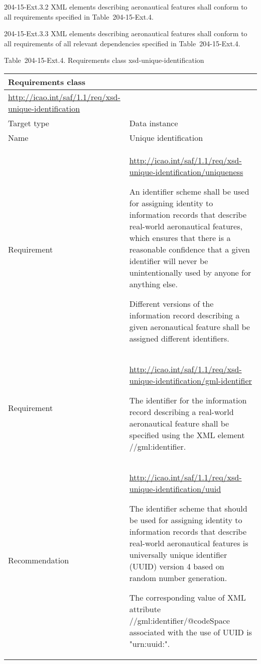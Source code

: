 204-15-Ext.3.2 XML elements describing aeronautical features shall conform to all requirements specified in Table~204-15-Ext.4.

204-15-Ext.3.3 XML elements describing aeronautical features shall conform to all requirements of all relevant dependencies specified in Table~204-15-Ext.4.

Table~204-15-Ext.4. Requirements class xsd-unique-identification

\begin{longtable}[]{@{}ll@{}}
\toprule
Requirements class &\tabularnewline
\midrule
\endhead
\url{http://icao.int/saf/1.1/req/xsd-unique-identification} &\tabularnewline
Target type & Data instance\tabularnewline
Name & Unique identification\tabularnewline
\begin{minipage}[t]{0.47\columnwidth}\raggedright
Requirement\strut
\end{minipage} & \begin{minipage}[t]{0.47\columnwidth}\raggedright
\url{http://icao.int/saf/1.1/req/xsd-unique-identification/uniqueness}

An identifier scheme shall be used for assigning identity to information records that describe real-world aeronautical features, which ensures that there is a reasonable confidence that a given identifier will never be unintentionally used by anyone for anything else.

Different versions of the information record describing a given aeronautical feature shall be assigned different identifiers.\strut
\end{minipage}\tabularnewline
\begin{minipage}[t]{0.47\columnwidth}\raggedright
Requirement\strut
\end{minipage} & \begin{minipage}[t]{0.47\columnwidth}\raggedright
\url{http://icao.int/saf/1.1/req/xsd-unique-identification/gml-identifier}

The identifier for the information record describing a real-world aeronautical feature shall be specified using the XML element //gml:identifier.\strut
\end{minipage}\tabularnewline
\begin{minipage}[t]{0.47\columnwidth}\raggedright
Recommendation\strut
\end{minipage} & \begin{minipage}[t]{0.47\columnwidth}\raggedright
\url{http://icao.int/saf/1.1/req/xsd-unique-identification/uuid}

The identifier scheme that should be used for assigning identity to information records that describe real-world aeronautical features is universally unique identifier (UUID) version 4 based on random number generation.

The corresponding value of XML attribute //gml:identifier/@codeSpace associated with the use of UUID is "urn:uuid:".\strut
\end{minipage}\tabularnewline
\bottomrule
\end{longtable}

